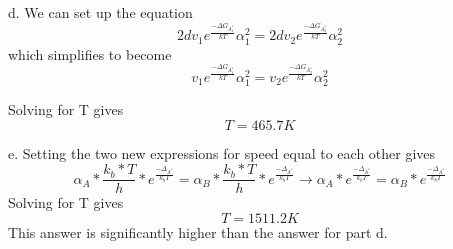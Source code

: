 \documentclass{article}
\begin{document}
\begin{enumerate}
d. We can set up the equation
$$2dv_1e^{\frac{-\Delta G_{A^*_1}}{kT}}\alpha_1^2=2dv_2e^{\frac{-\Delta G_{A^*_2}}{kT}}\alpha_2^2$$
which simplifies to become
$$v_1e^{\frac{-\Delta G_{A^*_1}}{kT}}\alpha_1^2=v_2e^{\frac{-\Delta G_{A^*_2}}{kT}}\alpha_2^2$$

Solving for T gives
$$T=465.7 K$$

e. Setting the two new expressions for speed equal to each other gives
$$\alpha_A*\frac{k_b*T}{h}*e^{\frac{-\Delta_{A^*}}{k_bT}}=\alpha_B*\frac{k_b*T}{h}*e^{\frac{-\Delta_{A^*}}{k_bT}}\rightarrow\alpha_A*e^{\frac{-\Delta_{A^*}}{k_bT}}=\alpha_B*e^{\frac{-\Delta_{A^*}}{k_bT}}$$
Solving for T gives
$$T=1511.2 K$$
This answer is significantly higher than the answer for part d.
\end{enumerate}
\end{document}
